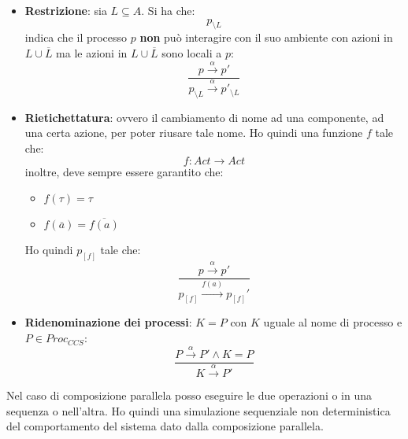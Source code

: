 \begin{itemize}
\begin{center}
          \end{center}
    \item \textbf{Restrizione}: sia $L \subseteq A$. Si ha che:
          \begin{equation}
              p_{\setminus L}
          \end{equation}
          indica che il processo $p$ \textbf{non} può interagire con il suo
          ambiente con azioni in $L \cup \overline{L}$ ma le azioni in
          $L \cup \overline{L}$ sono locali a $p$:
          \begin{equation}
              \frac{p \xrightarrow{\alpha} p'}{ p_{\setminus L}
              \xrightarrow{\alpha} p'_{\setminus L}}
          \end{equation}
    \item \textbf{Rietichettatura}: ovvero il cambiamento di nome ad una componente,
          ad una certa azione, per poter riusare tale nome. Ho quindi una
          funzione $f$ tale che:
          \begin{equation}
              f: Act \to Act
          \end{equation}
          inoltre, deve sempre essere garantito che:
          \begin{itemize}
              \item $f(\tau) = \tau$
              \item $f(\overline{a}) = \overline{f(a)}$
          \end{itemize}
          Ho quindi $p_{[f]}$ tale che:
          \begin{equation}
              \frac{p \xrightarrow{\alpha} p'}{p_{[f]} \xrightarrow{f(a)} p_{[f]}'}
          \end{equation}
    \item \textbf{Ridenominazione dei processi}: $K = P$ con $K$ uguale al nome
          di processo e $P \in Proc_{CCS}$:
          \begin{equation}
              \frac{P \xrightarrow{\alpha} P' \land K = P}{K \xrightarrow{\alpha} P'}
          \end{equation}
\end{itemize}
Nel caso di composizione parallela posso eseguire le due operazioni o in una
sequenza o nell'altra. Ho quindi una simulazione sequenziale non deterministica
del comportamento del sistema dato dalla composizione parallela.


